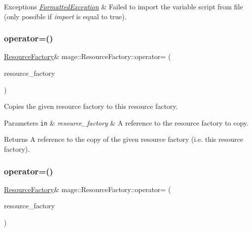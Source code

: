 \begin{DoxyExceptions}{Exceptions}
{\em \hyperlink{structmage_1_1_formatted_exception}{Formatted\+Exception}} & Failed to import the variable script from file (only possible if {\itshape import} is equal to {\ttfamily true}). \\
\hline
\end{DoxyExceptions}
\hypertarget{classmage_1_1_resource_factory_a1a99724dd744fde5ce2a1488966b30d0}{}\label{classmage_1_1_resource_factory_a1a99724dd744fde5ce2a1488966b30d0} 
\subsubsection{\texorpdfstring{operator=()}{operator=()}\hspace{0.1cm}{\footnotesize\ttfamily [1/2]}}
{\footnotesize\ttfamily \hyperlink{classmage_1_1_resource_factory}{Resource\+Factory}\& mage\+::\+Resource\+Factory\+::operator= (\begin{DoxyParamCaption}\item[{const \hyperlink{classmage_1_1_resource_factory}{Resource\+Factory} \&}]{resource\+\_\+factory }\end{DoxyParamCaption})\hspace{0.3cm}{\ttfamily [delete]}}

Copies the given resource factory to this resource factory.


\begin{DoxyParams}[1]{Parameters}
\mbox{\tt in}  & {\em resource\+\_\+factory} & A reference to the resource factory to copy. \\
\hline
\end{DoxyParams}
\begin{DoxyReturn}{Returns}
A reference to the copy of the given resource factory (i.\+e. this resource factory). 
\end{DoxyReturn}
\hypertarget{classmage_1_1_resource_factory_a4a1a0c064f068329f4b94c47ec17046f}{}\label{classmage_1_1_resource_factory_a4a1a0c064f068329f4b94c47ec17046f} 
\subsubsection{\texorpdfstring{operator=()}{operator=()}\hspace{0.1cm}{\footnotesize\ttfamily [2/2]}}
{\footnotesize\ttfamily \hyperlink{classmage_1_1_resource_factory}{Resource\+Factory}\& mage\+::\+Resource\+Factory\+::operator= (\begin{DoxyParamCaption}\item[{\hyperlink{classmage_1_1_resource_factory}{Resource\+Factory} \&\&}]{resource\+\_\+factory }\end{DoxyParamCaption})\hspace{0.3cm}{\ttfamily [delete]}}

